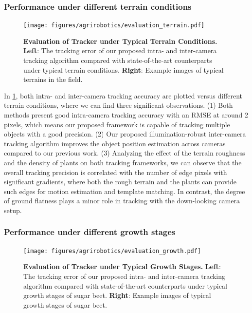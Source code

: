 \subsubsection{Performance under different terrain conditions}

\begin{figure}[t] 
	\centering
	\texttt{[image: figures/agrirobotics/evaluation\_terrain.pdf]}
	\caption[Evaluation of Tracker under Typical Terrain Conditions] { \textbf{Evaluation of Tracker under Typical Terrain Conditions.} \textbf{Left}: The tracking error of our proposed intra- and inter-camera tracking algorithm compared with state-of-the-art counterparts under typical terrain conditions. \textbf{Right}: Example images of typical terrains in the field. 
	\label{fig:agrirobotics_terrain}}
\end{figure}

In \ref{fig:agrirobotics_terrain}, both intra- and inter-camera tracking accuracy are plotted versus different terrain conditions, where we can find three significant observations. (1) Both methods present good intra-camera tracking accuracy with an RMSE at around 2 pixels, which means our proposed framework is capable of tracking multiple objects with a good precision. (2) Our proposed illumination-robust inter-camera tracking algorithm improves the object position estimation across cameras compared to our previous work. (3) Analyzing the effect of the terrain roughness and the density of plants on both tracking frameworks, we can observe that the overall tracking precision is correlated with the number of edge pixels with significant gradients, where both the rough terrain and the plants can provide such edges for motion estimation and template matching. In contrast, the degree of ground flatness plays a minor role in tracking with the down-looking camera setup. 


\subsubsection{Performance under different growth stages}

\begin{figure}[t] 
	\centering
	\texttt{[image: figures/agrirobotics/evaluation\_growth.pdf]}
	\caption[Evaluation of Tracker under Typical Growth Stages] { \textbf{Evaluation of Tracker under Typical Growth Stages.} \textbf{Left}: The tracking error of our proposed intra- and inter-camera tracking algorithm compared with state-of-the-art counterparts under typical growth stages of sugar beet. \textbf{Right}: Example images of typical growth stages of sugar beet. 
	\label{fig:agrirobotics_growth}}
\end{figure}

